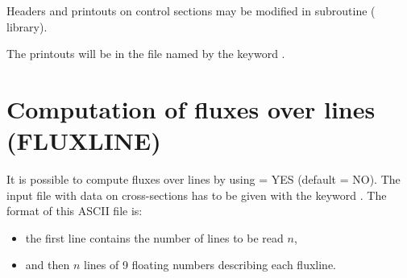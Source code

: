 Headers and printouts on control sections may be modified in
 subroutine ( library).

The printouts will be in the file named by the keyword
.


\section{Computation of fluxes over lines (FLUXLINE)}

It is possible to compute fluxes over lines by using
 = YES (default = NO).
The input file with data on cross-sections has to be given
with the keyword .
The format of this ASCII file is:
\begin{itemize}
\item the first line contains the number of lines to be read $n$,
\item and then $n$ lines of 9 floating numbers describing each fluxline.
\end{itemize}
